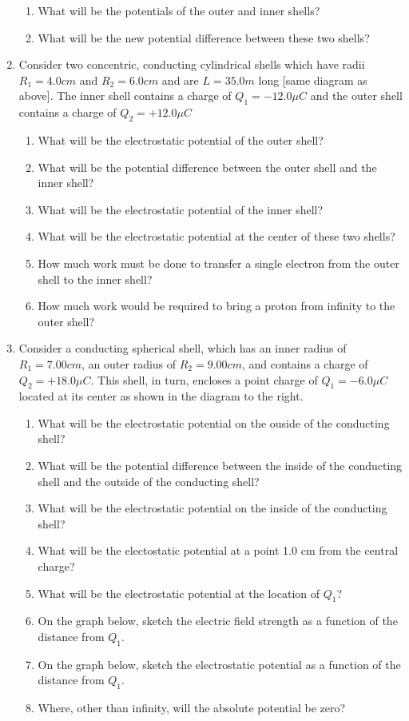 \documentclass[12pt]{article}
\begin{document}
\begin{enumerate}
\begin{enumerate}[resume]
  \item What will be the potentials of the outer and inner shells?
  \item What will be the new potential difference between these two shells?
\end{enumerate}

\item Consider two concentric, conducting cylindrical shells which have radii $R_{1} = 4.0cm$ and $R_{2} = 6.0cm$ and are $L= 35.0m$ long [same diagram as above]. The inner shell contains a charge of $Q_{1} = -12.0 \mu C$ and the outer shell contains a charge of $Q_{2} = +12.0 \mu C$
\begin{enumerate}
  \item What will be the electrostatic potential of the outer shell?
  \item What will be the potential difference between the outer shell and the inner shell?
  \item What will be the electrostatic potential of the inner shell?
  \item What will be the electrostatic potential at the center of these two shells?
  \item How much work must be done to transfer a single electron from the outer shell to the inner shell?
  \item How much work would be required to bring a proton from infinity to the outer shell?
\end{enumerate}

\item Consider a conducting spherical shell, which has an inner radius of $R_{1} = 7.00cm$, an outer radius of $R_{2} = 9.00cm$, and contains a charge of $Q_{2} = +18.0\mu C$. This shell, in turn, encloses a point charge of $Q_{1} = -6.0 \mu C$ located at its center as shown in the diagram to the right.
\begin{enumerate}
  \item What will be the electrostatic potential on the ouside of the conducting shell?
  \item What will be the potential difference between the inside of the conducting shell and the outside of the conducting shell?
  \item What will be the electrostatic potential on the inside of the conducting shell?
  \item What will be the electostatic potential at a point 1.0 cm from the central charge?
  \item What will be the electrostatic potential at the location of $Q_{1}$?
  \item On the graph below, sketch the electric field strength as a function of the distance from $Q_{1}$.
  \item On the graph below, sketch the electrostatic potential as a function of the distance from $Q_{1}$.
  \item Where, other than infinity, will the absolute potential be zero?
\end{enumerate}


\end{enumerate}
\end{document}
